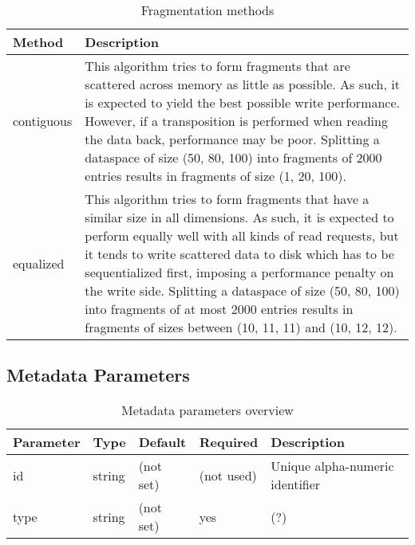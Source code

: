 \begin{preserve}
\begin{table}[!ht]
  \begin{center}
    \begin{tabularx}{\textwidth}{lX}
      Method     & Description \\
      \hline
      contiguous  & This algorithm tries to form fragments that are scattered across memory as little as possible. As such, it is expected to yield the best possible write performance. 
      However, if a transposition is performed when reading the data back, performance may be poor.
      Splitting a dataspace of size (50, 80, 100) into fragments of 2000 entries results in fragments of size (1, 20, 100). \\
      equalized   & This algorithm tries to form fragments that have a similar size in all dimensions. As such, it is expected to perform equally well with all kinds of read requests, but it tends to write scattered data to disk which has to be sequentialized first, imposing a performance penalty on the write side.
      Splitting a dataspace of size (50, 80, 100) into fragments of at most 2000 entries results in fragments of sizes between (10, 11, 11) and (10, 12, 12). \\
    \end{tabularx}
  \end{center}
  \caption{Fragmentation methods}%
  \label{tab:frag_methods}
\end{table}
\end{preserve}
\FloatBarrier
\vspace{\gapsize}

\subsection{Metadata Parameters}

\begin{preserve}
\begin{table}[!ht]
  \begin{center}
    \begin{tabularx}{\textwidth}{llllX}
      Parameter & Type   & Default   & Required   & Description                     \\ 
      \hline
      id        & string & (not set) & (not used) & Unique alpha-numeric identifier \\ 
      type      & string & (not set) & yes        & (?)                             \\ 
    \end{tabularx}
  \end{center}
  \caption{Metadata parameters overview}%
  \label{tab:metadata_params}
\end{table}
\end{preserve}

